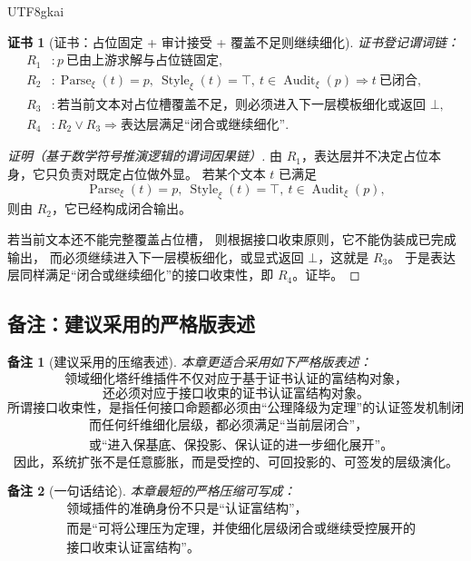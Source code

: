 \documentclass[12pt]{article}
\newtheorem{remark}{备注}[section]
\newtheorem{Certificate}{证书}[section]
\newcommand{\Parse}{\operatorname{Parse}}
\newcommand{\Audit}{\operatorname{Audit}}
\newcommand{\Style}{\operatorname{Style}}
\begin{document}
\begin{CJK*}{UTF8}{gkai}
\begin{Certificate}[证书：占位固定 + 审计接受 + 覆盖不足则继续细化]
\label{cert:tex37-ch9-render}
证书登记谓词链：
\[
\begin{aligned}
  R_1 &: p\ \text{已由上游求解与占位链固定},\\
  R_2 &: \Parse_\xi(t)=p,\ \Style_\xi(t)=\top,\ t\in\Audit_\xi(p)\Rightarrow t\ \text{已闭合},\\
  R_3 &: \text{若当前文本对占位槽覆盖不足，则必须进入下一层模板细化或返回 }\bot,\\
  R_4 &: R_2\vee R_3\Rightarrow \text{表达层满足“闭合或继续细化”}.
\end{aligned}
\]
\end{Certificate}

\begin{proof}[证明（基于数学符号推演逻辑的谓词因果链）]
由 $R_1$，表达层并不决定占位本身，它只负责对既定占位做外显。
若某个文本 $t$ 已满足
\[
  \Parse_\xi(t)=p,\ \Style_\xi(t)=\top,\ t\in\Audit_\xi(p),
\]
则由 $R_2$，它已经构成闭合输出。

若当前文本还不能完整覆盖占位槽，
则根据接口收束原则，它不能伪装成已完成输出，
而必须继续进入下一层模板细化，或显式返回 $\bot$，这就是 $R_3$。
于是表达层同样满足“闭合或继续细化”的接口收束性，即 $R_4$。证毕。
\end{proof}

\subsection{备注：建议采用的严格版表述}
\label{subsec:tex37-ch9-remarks}

\begin{remark}[建议采用的压缩表述]
本章更适合采用如下严格版表述：
\[
  \boxed{
    \text{领域细化塔纤维插件不仅对应于基于证书认证的富结构对象，}
  }
\]
\[
  \boxed{
    \text{还必须对应于接口收束的证书认证富结构对象。}
  }
\]
\[
  \boxed{
    \text{所谓接口收束性，是指任何接口命题都必须由“公理降级为定理”的认证签发机制闭合，}
  }
\]
\[
  \boxed{
    \begin{aligned}
      &\text{而任何纤维细化层级，都必须满足“当前层闭合”，}\\
      &\text{或“进入保基底、保投影、保认证的进一步细化展开”。}
    \end{aligned}
  }
\]
\[
  \boxed{
    \text{因此，系统扩张不是任意膨胀，而是受控的、可回投影的、可签发的层级演化。}
  }
\]
\end{remark}

\begin{remark}[一句话结论]
本章最短的严格压缩可写成：
\[
  \boxed{
    \begin{aligned}
      &\text{领域插件的准确身份不只是“认证富结构”，}\\
      &\text{而是“可将公理压为定理，并使细化层级闭合或继续受控展开的}\\
      &\text{接口收束认证富结构”。}
    \end{aligned}
  }
\]
\end{remark}


\end{CJK*}
\end{document}
